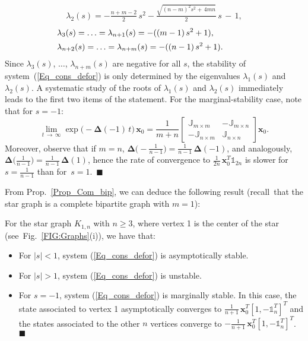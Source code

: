 \documentclass[letterpaper,9pt,twocolumn]{autart}
\newcommand{\vet}[1]{\ensuremath{{\mathbf #1}}}
\begin{document}
\begin{proposition}
$$\begin{array}{l}
\displaystyle \lambda_{2}(s) = -\frac{n+m-2}{2}\,s^2 - \frac{\sqrt{(n-m)^2 s^2 +\, 4mn}}{2}\,s \,-\, 1,
\end{array}
$$
$$
\begin{array}{l}
\displaystyle \hspace{-1.2cm}\lambda_{3}(s) = \ldots = \lambda_{n+1}(s) = -((m-1)\,s^2 + 1),\vspace{0.18cm}\\
\displaystyle \hspace{-1.2cm}\lambda_{n+2}(s) = \ldots = \lambda_{n+m}(s) = -((n-1)\,s^2 + 1).
\end{array}
$$
Since $\lambda_{3}(s)$, $\ldots$, $\lambda_{n+m}(s)$ are negative for
all $s$, the stability of system~(\ref{Eq_cons_defor}) is only
determined by the eigenvalues $\lambda_{1}(s)$ and $\lambda_{2}(s)$.
A systematic study of the roots of $\lambda_{1}(s)$ and
$\lambda_{2}(s)$ immediately leads to the first two items of the
statement. For the marginal-stability case, note that for $s = -1$:\vspace{-0.2cm}
$$
\!\lim_{t \,\rightarrow \, \infty}\exp\big(-\boldsymbol{\Delta}(-1)\,t\big)\,\vet{x}_0 =
\frac{1}{m+n} \left[
\begin{matrix}
\mathds{J}_{m \times m} & -\mathds{J}_{m \times n}\\ 
-\mathds{J}_{n \times m} & \mathds{J}_{n \times n}
\end{matrix}
\right]\!\vet{x}_0.
$$
Moreover, observe that if $m=n$, $\boldsymbol{\Delta}\big(\!-\!\frac{1}{n-1}\big) 
= \frac{1}{n-1}\,\boldsymbol{\Delta}(-1)$, and analogously,
$\boldsymbol{\Delta}\big(\frac{1}{n-1}\big) 
= \frac{1}{n-1}\,\boldsymbol{\Delta}(1)$, 
hence the rate of convergence to $\frac{1}{2n}\,\vet{x}_0^T\mathds{1}_{2n}$ is slower
for $s = \frac{1}{n-1}$ than for~$s = 1$.~\hfill$\blacksquare$
\end{proposition}
From Prop.~\ref{Prop_Com_bip}, we can deduce the following result (recall~that the star graph is a complete bipartite graph with $m=1$):

\begin{proposition}
For the star graph $K_{1,n}$ with $n \geq 3$, where vertex 1 is the
center of the star (see~Fig.~\ref{FIG:Graphs}(i)), we have that:
\begin{itemize}
\item For $|s| < 1$, system (\ref{Eq_cons_defor}) is asymptotically stable.
\item For $|s| > 1$, system (\ref{Eq_cons_defor}) is unstable.
\item For $s = -1$, system (\ref{Eq_cons_defor}) is marginally stable.
In this case, the state associated to vertex 1 asymptotically converges
to $\frac{1}{n+1}\,\vet{x}_0^T[1, -\mathds{1}^T_n]^T$
and the states associated to the other $n$ vertices converge to $-\frac{1}{n+1}\,\vet{x}_0^T[1, -\mathds{1}^T_n]^T$.~\hfill$\blacksquare$\vspace{0.05cm}
\end{itemize}
\end{proposition}
\end{document}
